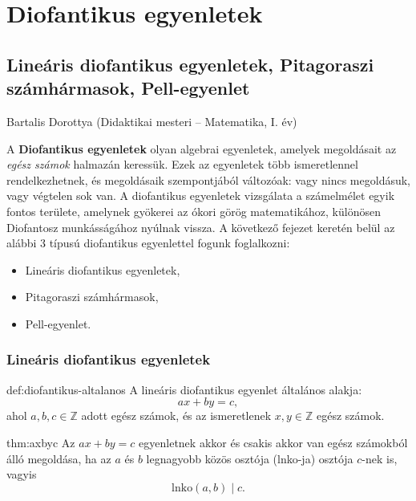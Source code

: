 \chapter{Diofantikus egyenletek}\label{chap:dio}
\section{Lineáris diofantikus egyenletek, Pitagoraszi szám\-hár\-ma\-sok, Pell-egyenlet}\label{sec:lindio}
\begin{description}
{\large \item [{Szerző:}] Bartalis Dorottya (Didaktikai mesteri -- Matematika, I. év) }
\end{description}
A \textbf{Diofantikus egyenletek} olyan algebrai egyenletek, amelyek
megoldásait az \textit{egész számok} halmazán keressük. Ezek az egyenletek
több ismeretlennel rendelkezhetnek, és megoldásaik szempontjából változóak:
vagy nincs megoldásuk, vagy végtelen sok van. A diofantikus egyenletek
vizsgálata a számelmélet egyik fontos területe, amelynek gyökerei
az ókori görög matematikához, különösen Diofantosz munkásságához nyúlnak
vissza. A következő fejezet keretén belül az alábbi 3 típusú diofantikus
egyenlettel fogunk foglalkozni:
\begin{itemize}
\item Lineáris diofantikus egyenletek, 
\item Pitagoraszi számhármasok, 
\item Pell-egyenlet. 
\end{itemize}

\subsection*{Lineáris diofantikus egyenletek}
\begin{definition}{def:diofantikus-altalanos}
A lineáris diofantikus egyenlet általános alakja:
\[
ax+by=c,
\]
ahol $a,b,c\in\mathbb{Z}$ adott egész számok, és az ismeretlenek
$x,y\in\mathbb{Z}$ egész számok. 
\end{definition}

\begin{theorem}{thm:axbyc}
Az $ax+by=c$ egyenletnek akkor és csakis akkor van egész számokból álló megoldása, ha az $a$ és $b$ legnagyobb közös osztója (lnko-ja) osztója
$c$-nek is, vagyis
\[
\mathrm{lnko}(a,b)\mid c.
\]
\end{theorem}

